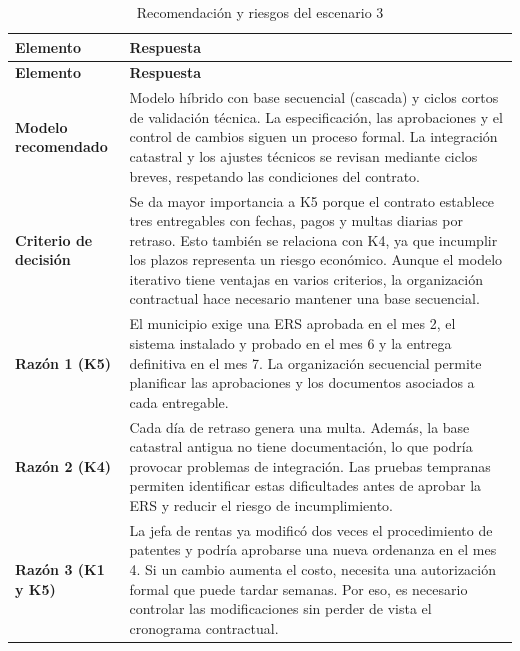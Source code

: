 \documentclass[12pt,a4paper]{article}
\begin{document}
\begin{longtable}{
>{\raggedright\arraybackslash}p{3.2cm}
>{\raggedright\arraybackslash}p{11.7cm}
}

\caption{Recomendación y riesgos del escenario 3}\\
\toprule
\textbf{Elemento} & \textbf{Respuesta} \\
\midrule
\endfirsthead

\toprule
\textbf{Elemento} & \textbf{Respuesta} \\
\midrule
\endhead

\textbf{Modelo recomendado} &
Modelo híbrido con base secuencial (cascada) y ciclos cortos
de validación técnica. La especificación, las aprobaciones
y el control de cambios siguen un proceso formal. La
integración catastral y los ajustes técnicos se revisan
mediante ciclos breves, respetando las condiciones del
contrato. \\
\midrule

\textbf{Criterio de decisión} &
Se da mayor importancia a K5 porque el contrato establece
tres entregables con fechas, pagos y multas diarias por
retraso. Esto también se relaciona con K4, ya que incumplir
los plazos representa un riesgo económico. Aunque el
modelo iterativo tiene ventajas en varios criterios,
la organización contractual hace necesario mantener
una base secuencial. \\
\midrule

\textbf{Razón 1 (K5)} &
El municipio exige una ERS aprobada en el mes 2, el sistema
instalado y probado en el mes 6 y la entrega definitiva
en el mes 7. La organización secuencial permite planificar
las aprobaciones y los documentos asociados a cada
entregable. \\
\midrule

\textbf{Razón 2 (K4)} &
Cada día de retraso genera una multa. Además, la base
catastral antigua no tiene documentación, lo que podría
provocar problemas de integración. Las pruebas tempranas
permiten identificar estas dificultades antes de aprobar
la ERS y reducir el riesgo de incumplimiento. \\
\midrule

\textbf{Razón 3 (K1 y K5)} &
La jefa de rentas ya modificó dos veces el procedimiento
de patentes y podría aprobarse una nueva ordenanza en
el mes 4. Si un cambio aumenta el costo, necesita una
autorización formal que puede tardar semanas. Por eso,
es necesario controlar las modificaciones sin perder
de vista el cronograma contractual. \\
\midrule


\end{longtable}
\end{document}
